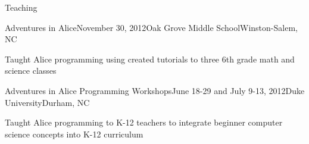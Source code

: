 \documentclass{resume} %
\begin{document}
\begin{rSection}{Teaching}

\begin{rSubsection}{Adventures in Alice}{November 30, 2012}{Oak Grove Middle School}{Winston-Salem, NC}
\item Taught Alice programming using created tutorials to three 6th grade math and science classes
\end{rSubsection}
\vspace{-5pt}

\begin{rSubsection}{Adventures in Alice Programming Workshops}{June 18-29 and July 9-13, 2012}{Duke University}{Durham, NC}
\item Taught Alice programming to K-12 teachers to integrate beginner computer science concepts into K-12 curriculum
\end{rSubsection}

\end{rSection}

\end{document}
